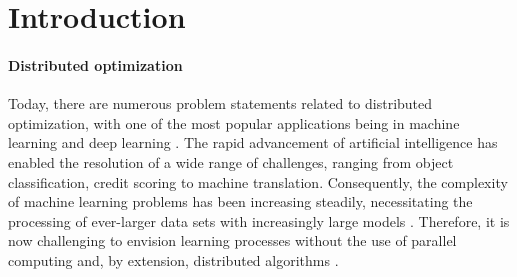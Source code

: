 \documentclass[sn-mathphys,Numbered]{sn-jnl}%
\renewcommand{\|}{\parallel}
\renewcommand {\*} {\ast}
\begin{document}
\section{Introduction}

\paragraph{Distributed optimization}
Today, there are numerous problem statements related to distributed optimization, with one of the most popular applications being in machine learning \cite{shalev2014understanding} and deep learning \cite{goodfellow2016deep}. The rapid advancement of artificial intelligence has enabled the resolution of a wide range of challenges, ranging from object classification,  
credit scoring to machine translation. 
Consequently, the complexity of machine learning problems has been increasing steadily, necessitating the processing of ever-larger data sets with increasingly large models \cite{arora2018optimization}. Therefore, it is now challenging to envision learning processes without the use of parallel computing and, by extension, distributed algorithms \cite{smith2018cocoa,mishchenko2019distributed,verbraeken2020survey,chraibi2019distributed,pirau2024preconditioning}.

\end{document}
